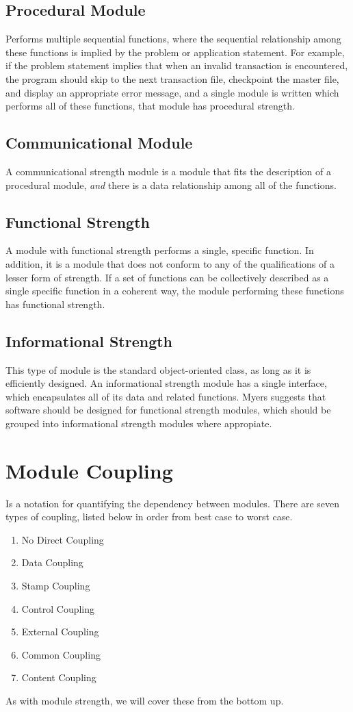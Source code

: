 \documentclass{designdoc}
\begin{document}
\subsection{Procedural Module}
Performs multiple sequential functions, where the sequential relationship
among these functions is implied by the problem or application statement. For
example, if the problem statement implies that when an invalid transaction is
encountered, the program should skip to the next transaction file, checkpoint
the master file, and display an appropriate error message, and a single
module is written which performs all of these functions, that module has
procedural strength.

\subsection{Communicational Module}
A communicational strength module is a module that fits the description of a
procedural module, {\it and} there is a data relationship among all of the
functions.

\subsection{Functional Strength}
A module with functional strength performs a single, specific function. In
addition, it is a module that does not conform to any of the qualifications of
a lesser form of strength. If a set of functions can be collectively described
as a single specific function in a coherent way, the module performing these
functions has functional strength.

\subsection{Informational Strength}
This type of module is the standard object-oriented class, as long as it is
efficiently designed. An informational strength module has a single interface,
which encapsulates all of its data and related functions. Myers suggests that
software should be designed for functional strength modules, which should be
grouped into informational strength modules where appropiate.

\section{Module Coupling}
Is a notation for quantifying the dependency between modules. There are seven
types of coupling, listed below in order from best case to worst case.
\begin{enumerate}
\item No Direct Coupling
\item Data Coupling
\item Stamp Coupling
\item Control Coupling
\item External Coupling
\item Common Coupling
\item Content Coupling
\end{enumerate}
As with module strength, we will cover these from the bottom up.
\end{document}
